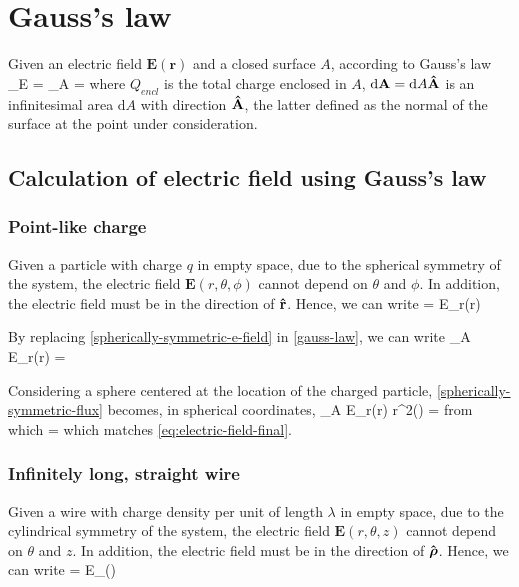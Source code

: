 
\chapter{Gauss's law}
Given an electric field $\mathbf{E}(\mathbf{r})$ and a closed surface $A$, according to Gauss's law
\be\label{gauss-law}
\Phi_E = \oiint_A  \cdot {} =
\ee
where $Q_{encl}$ is the total charge enclosed in $A$, $\mathrm{d}\mathbf{A}=\mathrm{d}A\boldsymbol{\hat{\textbf{$\mathrm A$}}}$ is an infinitesimal area $\mathrm{d}A$ with direction $\boldsymbol{\hat{\textbf{$\mathrm A$}}}$, the latter defined as the normal of the surface at the point under consideration.

\section{Calculation of electric field using Gauss's law}
\subsection{Point-like charge}
Given a particle with charge $q$ in empty space, due to the spherical symmetry of the system, the electric field $\mathbf{E}(r,\theta,\phi)$ cannot depend on $\theta$ and $\phi$. In addition, the electric field must be in the direction of $\boldsymbol{\hat{\textbf{$\mathrm r$}}}$. Hence, we can write
\be\label{spherically-symmetric-e-field}
 = E_r(r) \cdot {}
\ee

By replacing \ref{spherically-symmetric-e-field} in \ref{gauss-law}, we can write
\be\label{spherically-symmetric-flux}
\oiint_A E_r(r) \cdot {} \cdot {} =
\ee

Considering a sphere centered at the location of the charged particle, \ref{spherically-symmetric-flux} becomes, in spherical coordinates,
\be\label{spherically-symmetric-flux-2}
\oiint_A E_r(r) \cdot {} \cdot r^{2}\sin(\phi)\theta{}\phi{} =
\ee
from which
\be
{}=
\ee
which matches \ref{eq:electric-field-final}.


\subsection{Infinitely long, straight wire}
Given a wire with charge density per unit of length $\lambda$ in empty space, due to the cylindrical symmetry of the system, the electric field $\mathbf{E}(r,\theta,z)$ cannot depend on $\theta$ and $z$. In addition, the electric field must be in the direction of $\boldsymbol{\hat{\textbf{$\mathrm\rho$}}}$. Hence, we can write
\be\label{cylindrically-symmetric-e-field}
 = E_{\rho}(\rho) \cdot {}
\ee


